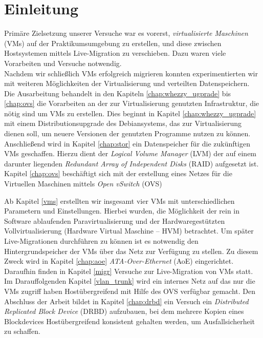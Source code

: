 

\chapter{Einleitung}

Primäre Zielsetzung unserer Versuche war es vorerst, \emph{virtualisierte
Maschinen} (VMs) auf der Praktikumsumgebung zu erstellen, und diese
zwischen Hostsystemen mittels Live-Migration zu verschieben. Dazu waren viele
Vorarbeiten und Versuche notwendig. \\
Nachdem wir schließlich VMs erfolgreich migrieren konnten experimentierten wir mit
weiteren Möglichkeiten der Virtualisierung und verteilten Datenspeichern.
\\
Die Ausarbeitung behandelt in den Kapiteln \ref{chap:whezzy_ugprade} bis \ref{chap:ovs} die Vorarbeiten
an der zur Virtualisierung genutzten Infrastruktur, die nötig sind um VMs zu erstellen.
Dies beginnt in Kapitel \ref{chap:whezzy_ugprade} mit einem Distributionsupgrade des Debiansystems, 
das zur Virtualisierung dienen soll, um neuere Versionen der genutzten Programme nutzen zu können. Anschließend wird in Kapitel \ref{chap:stor} ein Datenspeicher für die zukünftigen VMs geschaffen. Hierzu dient der \emph{Logical Volume Manager} (LVM) der auf einem darunter liegenden \emph{Redundant Array of Independent Disks} (RAID) aufgesetzt ist. Kapitel \ref{chap:ovs} beschäftigt sich mit der erstellung eines Netzes für die Virtuellen Maschinen mittels \emph{Open vSwitch} (OVS)

Ab Kapitel \ref{vms} erstellten wir insgesamt vier VMs mit unterschiedlichen
Parametern und Einstellungen. Hierbei wurden, die Möglichkeit der rein in Software ablaufenden Paravirtualisierung und der Hardwaregestützten Vollvirtualisierung (Hardware Virtual Maschine -- HVM) betrachtet. Um später Live-Migrationen durchführen zu können ist es notwendig den Hintergrundspeicher der VMs über das Netz zur Verfügung zu stellen. Zu diesem Zweck wird in Kapitel \ref{chap:aoe} \emph{ATA-Over-Ethernet} (AoE) eingerichtet. Daraufhin finden in Kapitel \ref{migr} Versuche zur Live-Migration von VMs statt. Im Darauffolgenden Kapitel \ref{vlan_trunk} wird ein internes Netz auf das nur die VMs zugriff haben Hostübergreifend mit Hilfe des OVS verfügbar gemacht. Den Abschluss der Arbeit bildet in Kapitel \ref{chap:drbd} ein Versuch ein \emph{Distributed Replicated Block Device} (DRBD) aufzubauen, bei dem mehrere Kopien eines Blockdevices Hostübergreifend konsistent gehalten werden, um Ausfallsicherheit zu schaffen.

